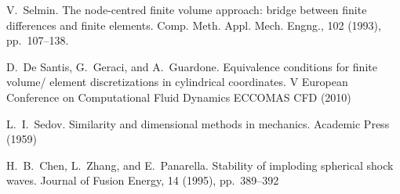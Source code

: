 
\begin{thebibliography}{10}
{\sc V.~Selmin}. {The node-centred finite volume approach: bridge between finite differences and finite elements}. Comp. Meth. Appl. Mech. Engng., 102 (1993), pp.~107--138.

{\sc D.~De Santis, G.~Geraci, and A.~Guardone}. {Equivalence conditions for finite volume/ element discretizations in cylindrical coordinates}. V European Conference on Computational Fluid Dynamics ECCOMAS CFD (2010)

{\sc L.~I.~Sedov}. {Similarity and dimensional methods in mechanics}. Academic Press (1959)
	
{\sc H.~B.~Chen, L.~Zhang, and E.~Panarella}. {Stability of imploding spherical shock waves}. Journal of Fusion Energy, 14 (1995), pp.~389--392
\end{thebibliography}